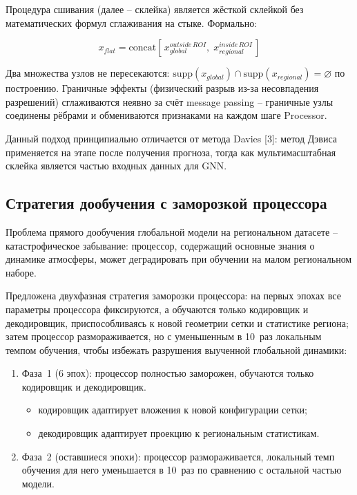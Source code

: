 \documentclass[14pt,a4paper]{extarticle}
\numberwithin{table}{section}
\numberwithin{figure}{section}
\numberwithin{equation}{section}
\providecommand{\tightlist}{%
  \setlength{\itemsep}{0pt}\setlength{\parskip}{0pt}}
\begin{document}
Процедура сшивания (далее -- склейка) является жёсткой склейкой без
математических формул сглаживания на стыке. Формально:

\[x_{flat} = \text{concat}\!\left[\, x_{global}^{outside\,ROI}, \; x_{regional}^{inside\,ROI} \,\right]\]

Два множества узлов не пересекаются:
\(\text{supp}(x_{global}) \cap \text{supp}(x_{regional}) = \varnothing\)
по построению. Граничные эффекты (физический разрыв из-за несовпадения
разрешений) сглаживаются неявно за счёт message passing -- граничные
узлы соединены рёбрами и обмениваются признаками на каждом шаге
Processor.

Данный подход принципиально отличается от метода Davies {[}3{]}: метод Дэвиса 
применяется на этапе после получения прогноза, тогда
как мультимасштабная склейка является частью входных данных для GNN.

\subsection{Стратегия дообучения с заморозкой процессора}\label{ux441ux442ux440ux430ux442ux435ux433ux438ux44f-ux434ux43eux43eux431ux443ux447ux435ux43dux438ux44f-ux441-ux437ux430ux43cux43eux440ux43eux437ux43aux43eux439-processor}

Проблема прямого дообучения глобальной модели на региональном датасете
-- катастрофическое забывание: процессор, содержащий основные
знания о динамике атмосферы, может деградировать при обучении на малом
региональном наборе.

Предложена двухфазная стратегия заморозки процессора: на первых
эпохах все параметры процессора фиксируются, а обучаются только
кодировщик и декодировщик, приспособливаясь к новой геометрии сетки
и статистике региона; затем процессор размораживается, но с
уменьшенным в 10~раз локальным темпом обучения, чтобы избежать
разрушения выученной глобальной динамики:

\begin{enumerate}
\def\labelenumi{\arabic{enumi}.}
\tightlist
\item
  Фаза~1 (6 эпох): процессор полностью заморожен, обучаются
  только кодировщик и декодировщик.
  \begin{itemize}
  \tightlist
  \item кодировщик адаптирует вложения к новой конфигурации сетки;
  \item декодировщик адаптирует проекцию к региональным статистикам.
  \end{itemize}
\item
  Фаза~2 (оставшиеся эпохи): процессор размораживается,
  локальный темп обучения для него уменьшается в 10~раз по сравнению
  с остальной частью модели.
\end{enumerate}
\end{document}
